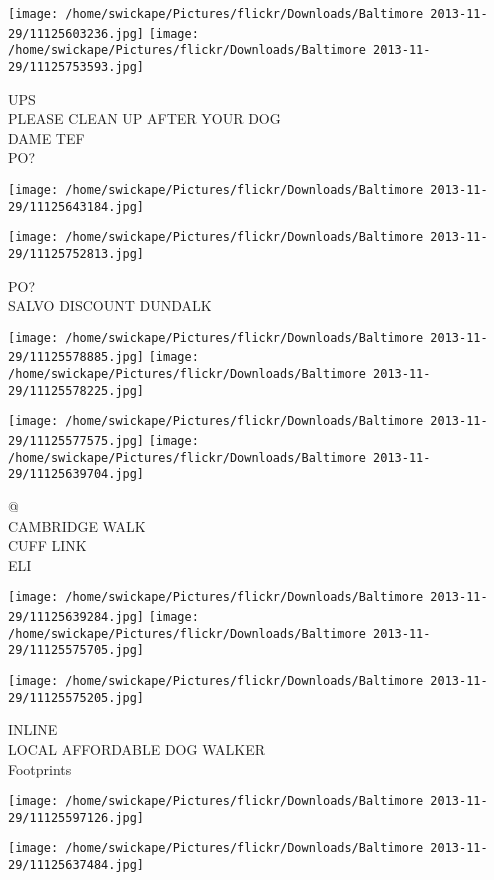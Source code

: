 \documentclass[10pt,letterpaper]{article}
\begin{document}
\texttt{[image: /home/swickape/Pictures/flickr/Downloads/Baltimore 2013-11-29/11125603236.jpg]}
\texttt{[image: /home/swickape/Pictures/flickr/Downloads/Baltimore 2013-11-29/11125753593.jpg]}

UPS\\
PLEASE CLEAN UP AFTER YOUR DOG\\
DAME TEF\\
PO?
\pagebreak

\texttt{[image: /home/swickape/Pictures/flickr/Downloads/Baltimore 2013-11-29/11125643184.jpg]}

\vspace{0.25in}
\texttt{[image: /home/swickape/Pictures/flickr/Downloads/Baltimore 2013-11-29/11125752813.jpg]}

PO?\\
SALVO DISCOUNT DUNDALK
\pagebreak

\texttt{[image: /home/swickape/Pictures/flickr/Downloads/Baltimore 2013-11-29/11125578885.jpg]}
\texttt{[image: /home/swickape/Pictures/flickr/Downloads/Baltimore 2013-11-29/11125578225.jpg]}

\texttt{[image: /home/swickape/Pictures/flickr/Downloads/Baltimore 2013-11-29/11125577575.jpg]}
\texttt{[image: /home/swickape/Pictures/flickr/Downloads/Baltimore 2013-11-29/11125639704.jpg]}

@\\
CAMBRIDGE WALK\\
CUFF LINK\\
ELI
\pagebreak

\texttt{[image: /home/swickape/Pictures/flickr/Downloads/Baltimore 2013-11-29/11125639284.jpg]}
\texttt{[image: /home/swickape/Pictures/flickr/Downloads/Baltimore 2013-11-29/11125575705.jpg]}

\texttt{[image: /home/swickape/Pictures/flickr/Downloads/Baltimore 2013-11-29/11125575205.jpg]}

INLINE\\
LOCAL AFFORDABLE DOG WALKER\\
Footprints
\pagebreak

\texttt{[image: /home/swickape/Pictures/flickr/Downloads/Baltimore 2013-11-29/11125597126.jpg]}

\vspace{0.25in}
\texttt{[image: /home/swickape/Pictures/flickr/Downloads/Baltimore 2013-11-29/11125637484.jpg]}
\end{document}

